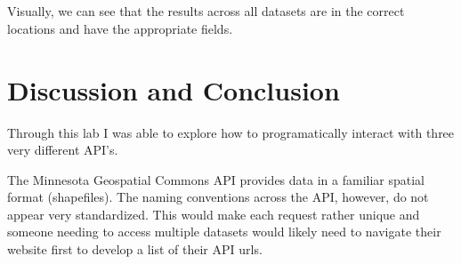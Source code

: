 \documentclass[article,12pt]{article}
\numberwithin{equation}{section}
\begin{document}
\begin{adjustwidth}{-.7in}{-.7in}
{\begin{minipage}{1\linewidth}
\begin{center}
\begin{minipage}{\linewidth}
				\end{minipage}
			\end{center}
		\end{minipage}
	}\\
	\\
\end{adjustwidth}

Visually, we can see that the results across all datasets are in the correct locations and have the appropriate fields.

\section*{Discussion and Conclusion}

Through this lab I was able to explore how to programatically interact with three very different API's. 

The Minnesota Geospatial Commons API provides data in a familiar spatial format (shapefiles). The naming conventions across the API, however, do not appear very standardized. This would make each request rather unique and someone needing to access multiple datasets would likely need to navigate their website first to develop a list of their API urls.
\end{document}
